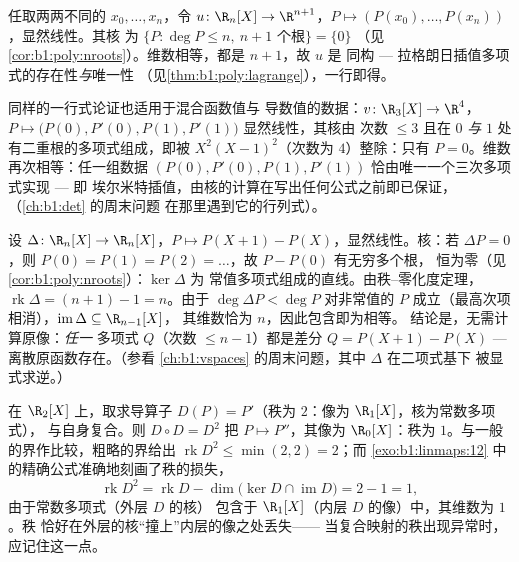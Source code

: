\begin{example}[从结构看插值]\label{ex:b1:linmaps:interpolation}
任取两两不同的 $x_0, \dots, x_n$，令 $u \colon \R_n[X] \to
\R^{n+1}$，$P \mapsto (P(x_0), \dots, P(x_n))$，显然线性。其核
为 $\{P : \deg P \leq n,\ n+1 \text{ 个根}\} = \{0\}$
（见\cref{cor:b1:poly:nroots}）。维数相等，都是 $n + 1$，故 $u$ 是
同构 --- 拉格朗日插值多项式的存在性\emph{与}唯一性
（见\cref{thm:b1:poly:lagrange}），一行即得。

同样的一行式论证也适用于混合函数值与
导数值的数据：$v \colon \R_3[X] \to \R^4$，$P \mapsto \bigl(P(0),
P'(0), P(1), P'(1)\bigr)$ 显然线性，其核由
次数 $\leq 3$ 且在 $0$ \emph{与}
$1$ 处有二重根的多项式组成，即被 $X^2(X-1)^2$（次数为 $4$）整除：只有 $P =
0$。维数再次相等：任一组数据 $(P(0),
P'(0), P(1), P'(1))$ 恰由唯一一个三次多项式实现 ---
即 埃尔米特插值，由核的计算在写出任何公式之前即已保证，
（\cref{ch:b1:det} 的周末问题
在那里遇到它的行列式）。
\end{example}

\begin{example}
\label{ex:b1:linmaps:delta}
设 $\Delta \colon \R_n[X] \to \R_n[X]$，$P \mapsto P(X+1) -
P(X)$，显然线性。核：若 $\Delta P = 0$，则 $P(0) = P(1) =
P(2) = \dots$，故 $P - P(0)$ 有无穷多个根，
恒为零（见\cref{cor:b1:poly:nroots}）：$\ker\Delta$ 为
常值多项式组成的直线。由秩--零化度定理，$\operatorname{rk}\Delta = (n + 1) - 1
= n$。由于 $\deg \Delta P < \deg P$ 对非常值的 $P$ 成立（最高次项
相消），$\operatorname{im}\Delta \subseteq \R_{n-1}[X]$，
其维数恰为 $n$，因此包含即为相等。
结论是，无需计算原像：\emph{任一}
多项式 $Q$（次数 $\leq n - 1$）都是差分 $Q = P(X+1)
- P(X)$ --- 离散原函数存在。（参看
\cref{ch:b1:vspaces} 的周末问题，其中 $\Delta$ 在二项式基下
被显式求逆。）
\end{example}

\begin{example}[复合映射中的秩的核算]
\label{ex:b1:linmaps:rankbookkeeping}
在 $\R_2[X]$ 上，取求导算子 $D(P) = P'$（秩为 $2$：像为 $\R_1[X]$，核为常数多项式），
与自身复合。则 $D
\circ D = D^2$ 把 $P \mapsto P''$，其像为 $\R_0[X]$：秩为
$1$。与一般的界作比较，粗略的界给出
$\operatorname{rk} D^2 \leq \min(2, 2) = 2$；而
\cref{exo:b1:linmaps:12} 中的精确公式准确地刻画了秩的损失，
\[
\operatorname{rk} D^2 = \operatorname{rk} D -
\dim\bigl(\ker D \cap \operatorname{im} D\bigr) = 2 - 1 = 1 ,
\]
由于常数多项式（外层 $D$ 的核）
包含于 $\R_1[X]$（内层 $D$ 的像）中，其维数为 $1$。秩
恰好在外层的核“撞上”内层的像之处丢失——
当复合映射的秩出现异常时，应记住这一点。
\end{example}

